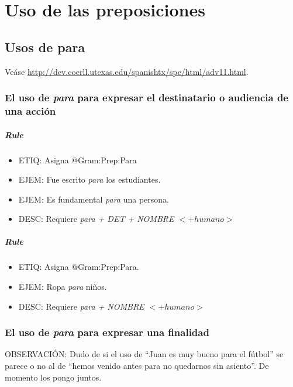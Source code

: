 \documentclass[11pt]{report}
\begin{document}
\chapter{Uso de las preposiciones}
\section{Usos de para}
Veáse \url{http://dev.coerll.utexas.edu/spanishtx/spe/html/adv11.html}.

\subsection{El uso de \emph{para} para expresar el destinatario o audiencia de una acción}
\paragraph*{Rule}
\begin{itemize}
\item ETIQ: Asigna @Gram:Prep:Para
\item EJEM: Fue escrito \emph{para} los estudiantes.
\item EJEM: Es fundamental \emph{para} una persona.
\item DESC: Requiere \emph{para + DET + NOMBRE $<+humano>$}
\end{itemize}

\paragraph*{Rule}
\begin{itemize}
\item ETIQ: Asigna @Gram:Prep:Para.
\item EJEM: Ropa \emph{para} niños.
\item DESC: Requiere \emph{para + NOMBRE $<+humano>$}
\end{itemize}

\subsection{El uso de \emph{para} para expresar una finalidad}
OBSERVACIÓN: Dudo de si el uso de ``Juan es muy bueno para el fútbol'' se parece o no al de ``hemos venido antes para no quedarnos sin asiento''. De momento los pongo juntos.
\end{document}
